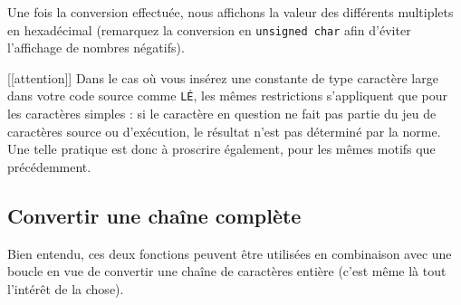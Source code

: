 \documentclass[]{article}
\begin{document}
Une fois la conversion effectuée, nous affichons la valeur des
différents multiplets en hexadécimal (remarquez la conversion en
\texttt{unsigned\ char} afin d'éviter l'affichage de nombres négatifs).

{[}{[}attention{]}{]} \textbar{} Dans le cas où vous insérez une
constante de type caractère large dans votre code source comme
\texttt{L\textquotesingle{}É\textquotesingle{}}, les mêmes restrictions
s'appliquent que pour les caractères simples : si le caractère en
question ne fait pas partie du jeu de caractères source ou d'exécution,
le résultat n'est pas déterminé par la norme. Une telle pratique est
donc à proscrire également, pour les mêmes motifs que précédemment.

\subsection{Convertir une chaîne
complète}\label{convertir-une-chauxeene-compluxe8te}

Bien entendu, ces deux fonctions peuvent être utilisées en combinaison
avec une boucle en vue de convertir une chaîne de caractères entière
(c'est même là tout l'intérêt de la chose).
\end{document}
